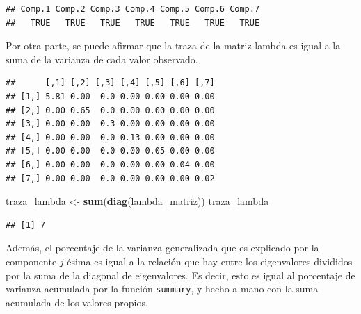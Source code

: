 \documentclass[
]{book}
\newenvironment{Shaded}{\begin{snugshade}}{\end{snugshade}}
\newcommand{\DecValTok}[1]{\textcolor[rgb]{0.00,0.00,0.81}{#1}}
\newcommand{\FunctionTok}[1]{\textcolor[rgb]{0.13,0.29,0.53}{\textbf{#1}}}
\newcommand{\NormalTok}[1]{#1}
\newcommand{\OtherTok}[1]{\textcolor[rgb]{0.56,0.35,0.01}{#1}}
\newcommand{\SpecialCharTok}[1]{\textcolor[rgb]{0.81,0.36,0.00}{\textbf{#1}}}
\begin{document}
\begin{Shaded}
\end{Shaded}

\begin{verbatim}
## Comp.1 Comp.2 Comp.3 Comp.4 Comp.5 Comp.6 Comp.7 
##   TRUE   TRUE   TRUE   TRUE   TRUE   TRUE   TRUE
\end{verbatim}

Por otra parte, se puede afirmar que la traza de la matriz lambda es igual a la suma de la varianza de cada valor observado.

\begin{Shaded}
\end{Shaded}

\begin{verbatim}
##      [,1] [,2] [,3] [,4] [,5] [,6] [,7]
## [1,] 5.81 0.00  0.0 0.00 0.00 0.00 0.00
## [2,] 0.00 0.65  0.0 0.00 0.00 0.00 0.00
## [3,] 0.00 0.00  0.3 0.00 0.00 0.00 0.00
## [4,] 0.00 0.00  0.0 0.13 0.00 0.00 0.00
## [5,] 0.00 0.00  0.0 0.00 0.05 0.00 0.00
## [6,] 0.00 0.00  0.0 0.00 0.00 0.04 0.00
## [7,] 0.00 0.00  0.0 0.00 0.00 0.00 0.02
\end{verbatim}

\begin{Shaded}
\begin{Highlighting}[]
\NormalTok{traza\_lambda }\OtherTok{\textless{}{-}} \FunctionTok{sum}\NormalTok{(}\FunctionTok{diag}\NormalTok{(lambda\_matriz))}
\NormalTok{traza\_lambda}
\end{Highlighting}
\end{Shaded}

\begin{verbatim}
## [1] 7
\end{verbatim}

Además, el porcentaje de la varianza generalizada que es explicado por la componente \(j\)-ésima es igual a la relación que hay entre los eigenvalores divididos por la suma de la diagonal de eigenvalores. Es decir, esto es igual al porcentaje de varianza acumulada por la función \texttt{summary}, y hecho a mano con la suma acumulada de los valores propios.
\end{document}
